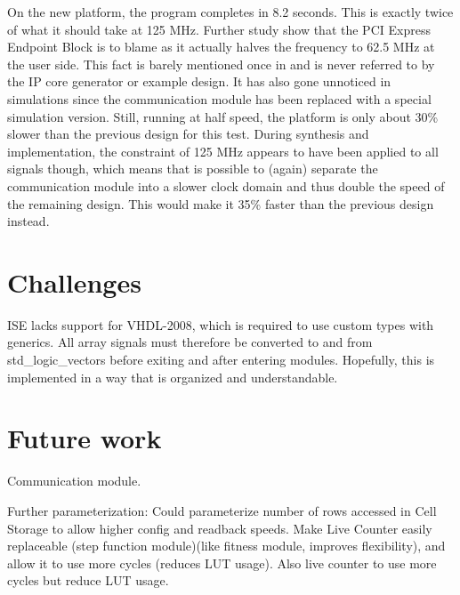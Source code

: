 On the new platform, the program completes in 8.2 seconds.
This is exactly twice of what it should take at 125 MHz.
Further study show that the PCI Express Endpoint Block is to blame as it actually halves the frequency to 62.5 MHz at the user side.
This fact is barely mentioned once in \cite{ug672} and is never referred to by the IP core generator or example design.
It has also gone unnoticed in simulations since the communication module has been replaced with a special simulation version.
Still, running at half speed, the platform is only about 30\% slower than the previous design for this test.
During synthesis and implementation, the constraint of 125 MHz appears to have been applied to all signals though, which means that is possible to (again) separate the communication module into a slower clock domain and thus double the speed of the remaining design.
This would make it 35\% faster than the previous design instead.


\section{Challenges}
\label{sec:challenges}

\TODO

ISE lacks support for VHDL-2008, which is required to use custom types with generics.
All array signals must therefore be converted to and from std\_logic\_vectors before exiting and after entering modules.
Hopefully, this is implemented in a way that is organized and understandable.

\TODO


\section{Future work}

Communication module.

\TODO

Further parameterization:
Could parameterize number of rows accessed in Cell Storage to allow higher config and readback speeds.
Make Live Counter easily replaceable (step function module)(like fitness module, improves flexibility), and allow it to use more cycles (reduces LUT usage).
Also live counter to use more cycles but reduce LUT usage.


